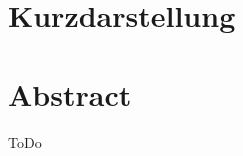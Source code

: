 \thispagestyle{empty}
\section*{Kurzdarstellung}
\label{sec:kurzdarstellung}

\blindtext


\section*{Abstract}
\label{sec:abstract}

ToDo

